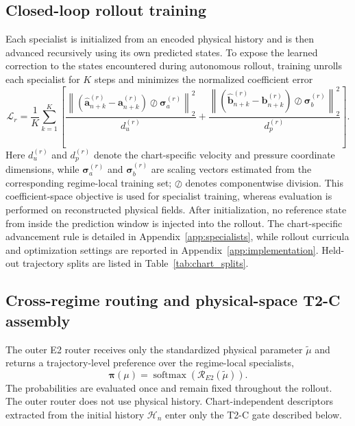 \subsection{Closed-loop rollout training}

Each specialist is initialized from an encoded physical history and is then advanced recursively using its own predicted states. To expose the learned correction to the states encountered during autonomous rollout, training unrolls each specialist for $K$ steps and minimizes the
normalized coefficient error
\begin{equation}
  \mathcal L_r=\frac{1}{K}\sum_{k=1}^{K}\left[
  \frac{\left\|(\widehat{\bm a}_{n+k}^{(r)}-\bm a_{n+k}^{(r)})
  \oslash\bm\sigma_a^{(r)}\right\|_2^2}{d_u^{(r)}}
  +\frac{\left\|(\widehat{\bm b}_{n+k}^{(r)}-\bm b_{n+k}^{(r)})
  \oslash\bm\sigma_b^{(r)}\right\|_2^2}{d_p^{(r)}}\right].
  \label{eq:main_rollout_loss}
\end{equation}
Here $d_u^{(r)}$ and $d_p^{(r)}$ denote the chart-specific velocity and pressure coordinate dimensions, while $\bm\sigma_a^{(r)}$ and $\bm\sigma_b^{(r)}$ are scaling
vectors estimated from the corresponding regime-local training set; $\oslash$ denotes componentwise division. This coefficient-space objective is used for specialist training, whereas evaluation is performed on reconstructed physical fields. After initialization, no reference state from inside the prediction window is injected into the rollout. The chart-specific advancement rule is detailed in Appendix~\ref{app:specialists}, while rollout curricula and optimization settings are reported in Appendix~\ref{app:implementation}. Held-out trajectory splits are listed in Table~\ref{tab:chart_splits}.



\subsection{Cross-regime routing and physical-space T2-C assembly}

The outer E2 router receives only the standardized physical parameter $\widetilde\mu$ and returns a trajectory-level preference over the
regime-local specialists,
\[
\bm\pi(\mu)
=
\operatorname{softmax}\!\left(
\mathcal R_{E2}(\widetilde\mu)
\right).
\]
The probabilities are evaluated once and remain fixed throughout the rollout. The outer router does not use physical history. Chart-independent descriptors extracted from the initial history $\mathcal H_n$ enter only the T2-C gate described below.

